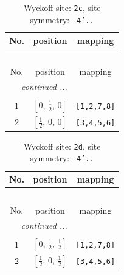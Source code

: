 \documentclass[fleqn,8pt]{jsarticle}
\begin{document}
\renewcommand{\arraystretch}{1.2}
\begin{longtable}{ccc}
\caption{Wyckoff site: {\tt 2c}, site symmetry: {\tt -4'..}}
 \\
 \hline \hline
No. & position & mapping \\ \hline \endfirsthead

\multicolumn{2}{l}{\tablename\ \thetable{}} \\
 \hline \hline
No. & position & mapping \\ \hline \endhead

 \hline \hline
\multicolumn{2}{r}{\footnotesize\it continued ...} \\ \endfoot

 \hline \hline
\multicolumn{2}{r}{} \\ \endlastfoot

1 & $\left[ 0,\, \frac{1}{2},\, 0 \right]$ & {\tt [1,2,7,8]} \\ \hline
2 & $\left[ \frac{1}{2},\, 0,\, 0 \right]$ & {\tt [3,4,5,6]} \\
\end{longtable}
\renewcommand{\arraystretch}{1.2}
\begin{longtable}{ccc}
\caption{Wyckoff site: {\tt 2d}, site symmetry: {\tt -4'..}}
 \\
 \hline \hline
No. & position & mapping \\ \hline \endfirsthead

\multicolumn{2}{l}{\tablename\ \thetable{}} \\
 \hline \hline
No. & position & mapping \\ \hline \endhead

 \hline \hline
\multicolumn{2}{r}{\footnotesize\it continued ...} \\ \endfoot

 \hline \hline
\multicolumn{2}{r}{} \\ \endlastfoot

1 & $\left[ 0,\, \frac{1}{2},\, \frac{1}{2} \right]$ & {\tt [1,2,7,8]} \\ \hline
2 & $\left[ \frac{1}{2},\, 0,\, \frac{1}{2} \right]$ & {\tt [3,4,5,6]} \\
\end{longtable}
\renewcommand{\arraystretch}{1.2}
\end{document}
